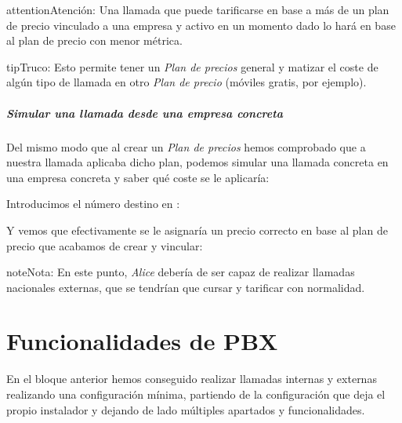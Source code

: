 \documentclass[letterpaper,10pt,spanish]{sphinxmanual}
\begin{document}
\begin{notice}{attention}{Atención:}
Una llamada que puede tarificarse en base a más de un plan de precio vinculado a una empresa y activo en un momento dado lo hará en base al plan de precio con menor métrica.
\end{notice}

\begin{notice}{tip}{Truco:}
Esto permite tener un \emph{Plan de precios} general y matizar el coste de algún tipo de llamada en otro \emph{Plan de precio} (móviles gratis, por ejemplo).
\end{notice}
\paragraph{Simular una llamada desde una empresa concreta}

Del mismo modo que al crear un \emph{Plan de precios} hemos comprobado que a nuestra llamada aplicaba dicho plan, podemos simular una llamada concreta en una empresa concreta y saber qué coste se le aplicaría:

\noindent{}

Introducimos el número destino en {\hyperref[external_incoming_calls/numeric_transformations:e164]{}}:


Y vemos que efectivamente se le asignaría un precio correcto en base al plan de precio que acabamos de crear y vincular:

\noindent{}

\begin{notice}{note}{Nota:}
En este punto, \emph{Alice} debería de ser capaz de realizar llamadas nacionales externas, que se tendrían que cursar y tarificar con normalidad.
\end{notice}


\chapter{Funcionalidades de PBX}
\label{pbx_features/index::doc}\label{pbx_features/index:funcionalidades-de-pbx}
En el bloque anterior hemos conseguido realizar llamadas internas y externas realizando una configuración mínima, partiendo de la configuración que deja el propio instalador y dejando de lado múltiples apartados y funcionalidades.
\end{document}
